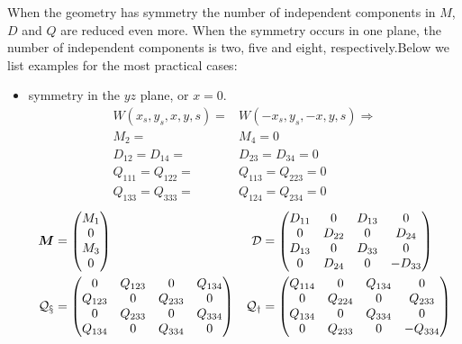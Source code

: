 \begin{apendicesenv}
    When the geometry has symmetry the number of independent components in $M$, $D$ and $Q$ are reduced even more.
    When the symmetry occurs in one plane, the number of independent components is two, five and eight, respectively.Below we list examples for the most practical cases:

    \begin{itemize}
    \item symmetry in the $yz$ plane, or $x=0$.
    \begin{align}
		W(x_s,y_s,x,y,s) = & W(-x_s,y_s,-x,y,s) \Rightarrow \\
		M_2= & M_4=0\\
		D_{12}=D_{14}= & D_{23}=D_{34}=0\\
		Q_{111}=Q_{122}= & Q_{113}=Q_{223}=0\\
		Q_{133}=Q_{333}= & Q_{124}=Q_{234}=0
    \end{align}
    \begin{align}
		\boldsymbol{M}&= \begin{pmatrix} M_{1}\\ 0\\ M_{3}\\ 0\end{pmatrix} &
		\mathcal{D} &= \begin{pmatrix} D_{11} &    0   & D_{13} &    0    \\
                                  0   & D_{22} &    0   &  D_{24} \\
                               D_{13} &    0   & D_{33} &    0    \\
                                  0   & D_{24} &    0   & -D_{33}
               \end{pmatrix}\\
		\mathcal{Q_x}&=\begin{pmatrix}    0    & Q_{123} &    0    & Q_{134} \\
                               Q_{123} &    0    & Q_{233} &    0    \\
                                  0    & Q_{233} &    0    & Q_{334} \\
                               Q_{134} &    0    & Q_{334} &    0
               \end{pmatrix} &
		\mathcal{Q_y}&=\begin{pmatrix} Q_{114} &    0    & Q_{134} &    0    \\
                                  0    & Q_{224} &    0    & Q_{233} \\
                               Q_{134} &    0    & Q_{334} &    0    \\
                                  0    & Q_{233} &    0    & -Q_{334}
               \end{pmatrix}
    \end{align}


\end{itemize}
\end{apendicesenv}
